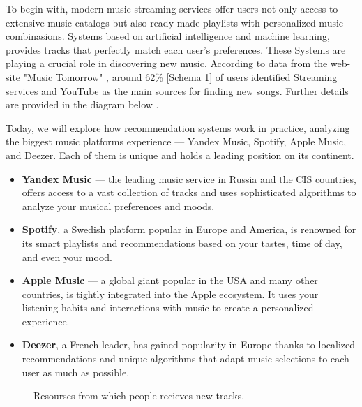 \documentclass[12pt,a4paper]{article}
\begin{document}
To begin with, modern music streaming services offer users not only access to extensive music catalogs but also ready-made playlists with personalized music combinasions. Systems based on artificial intelligence and machine learning, provides tracks that perfectly match each user's preferences. These Systems are playing a crucial role in discovering new music. According to data from the web-site "Music Tomorrow" , around 62\% \autoref{Schema 1} of users identified Streaming services and YouTube as the main sources for finding new songs. Further details are provided in the diagram below \citep{href}\citep{Woman}.

Today, we will explore how recommendation systems work in practice, analyzing the biggest music platforms experience — Yandex Music, Spotify, Apple Music, and Deezer. Each of them is unique and holds a leading position on its continent.

\begin{itemize}
 \item \textbf{Yandex Music} — the leading music service in Russia and the CIS countries, offers access to a vast collection of tracks and uses sophisticated algorithms to analyze your musical preferences and moods.

\item \textbf{Spotify}, a Swedish platform popular in Europe and America, is renowned for its smart playlists and recommendations based on your tastes, time of day, and even your mood.

\item \textbf{Apple Music} — a global giant popular in the USA and many other countries, is tightly integrated into the Apple ecosystem. It uses your listening habits and interactions with music to create a personalized experience.

\item \textbf{Deezer}, a French leader, has gained popularity in Europe thanks to localized recommendations and unique algorithms that adapt music selections to each user as much as possible.

\end{itemize}

\begin{figure}
\caption{Resourses from which people recieves new tracks\citep{Diagramm}\citep{Arbat}.}
\label{Schema 1}
\end{figure}
\end{document}
